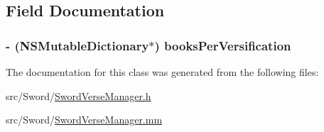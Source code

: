 \subsection{Field Documentation}
\hypertarget{interface_sword_verse_manager_a8db39dd937ba18fc1560ff8db1780b5e}{
\subsubsection[{books\-Per\-Versification}]{\setlength{\rightskip}{0pt plus 5cm}-\/ (N\-S\-Mutable\-Dictionary$\ast$) books\-Per\-Versification\hspace{0.3cm}{\ttfamily [protected]}}}\label{interface_sword_verse_manager_a8db39dd937ba18fc1560ff8db1780b5e}


The documentation for this class was generated from the following files\-:\begin{DoxyCompactItemize}
\item 
src/\-Sword/\hyperlink{_sword_verse_manager_8h}{Sword\-Verse\-Manager.\-h}\item 
src/\-Sword/\hyperlink{_sword_verse_manager_8mm}{Sword\-Verse\-Manager.\-mm}\end{DoxyCompactItemize}
